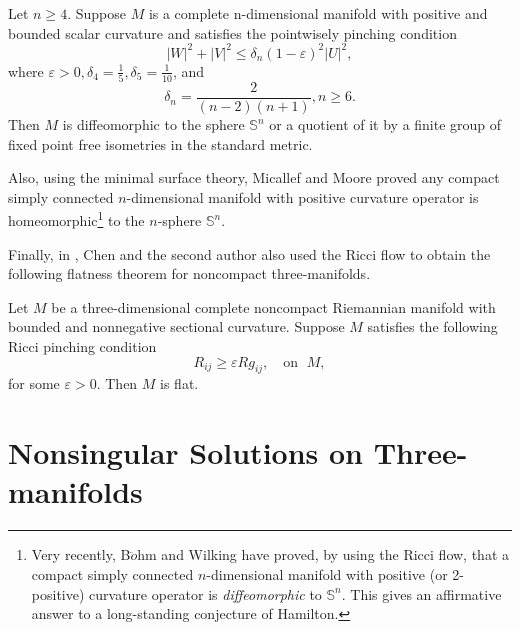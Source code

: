 \begin{theorem}
  \label{thm:cz-higher-dimensional-pointwise-pinched-sphere}

Let $n\ge4$. Suppose $M$ is a complete n-dimensional manifold with
positive and bounded scalar curvature and satisfies the
pointwisely pinching condition
$$
|W|^2+|V|^2\le\delta_n(1-\varepsilon)^2|U|^2,
$$
where $\varepsilon>0,\delta_4=\frac{1}{5},\delta_5=\frac{1}{10}$,
and
$$
\delta_n=\frac{2}{(n-2)(n+1)},n\ge 6.
$$
Then $M$ is diffeomorphic to the sphere $\mathbb{S}^n$ or a
quotient of it by a finite group of fixed point free isometries in
the standard metric.
\end{theorem}

Also, using the minimal surface theory, Micallef and Moore
\cite{MiMo} proved any compact simply connected $n$-dimensional
manifold with positive curvature operator is
homeomorphic\footnote{Very recently, B$\ddot{o}$hm and Wilking
\cite{BW} have proved, by using the Ricci flow, that a compact
simply connected $n$-dimensional manifold with positive (or
2-positive) curvature operator is {\it diffeomorphic} to
$\mathbb{S}^n$. This gives an affirmative answer to a
long-standing conjecture of Hamilton.} to the $n$-sphere
$\mathbb{S}^n$.

Finally, in \cite{CZ00}, Chen and the second author also used the
Ricci flow to obtain the following flatness theorem for noncompact
three-manifolds.

\begin{theorem}
  \label{thm:cz-noncompact-three-manifold-ricci-pinching-flatness}

Let $M$ be a three-dimensional complete noncompact Riemannian
manifold with bounded and nonnegative sectional curvature. Suppose
$M$ satisfies the following Ricci pinching condition
$$
R_{ij}\ge \varepsilon Rg_{ij},\quad \text{on }\; M,
$$
for some $\varepsilon>0$. Then $M$ is flat.
\end{theorem}

\vskip 1cm


\section{Nonsingular Solutions on Three-manifolds}

